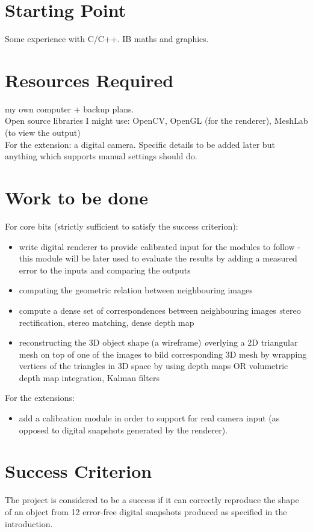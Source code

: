 \section*{Starting Point}
Some experience with C/C++.
IB maths and graphics.

\section*{Resources Required}
my own computer + backup plans.\\
Open source libraries I might use: OpenCV, OpenGL (for the renderer), MeshLab (to view the output) \\
For the extension: a digital camera. Specific details to be added later but anything which supports manual settings should do.  


\section*{Work to be done}
For core bits (strictly sufficient to satisfy the success criterion):
\begin{itemize}
\item write digital renderer to provide calibrated input for the modules to follow - this module will be later used to evaluate the results by adding a measured error to the inputs and comparing the outputs
\item computing the geometric relation between neighbouring images
\item compute a dense set of correspondences between neighbouring images
{\emph stereo rectification, stereo matching, dense depth map}
\item reconstructing the 3D object shape (a wireframe)
{\emph overlying a 2D triangular mesh on top of one of the images to bild corresponding 3D mesh by wrapping vertices of the triangles in 3D space by using depth maps OR volumetric depth map integration, Kalman filters}
\end{itemize}
For the extensions:
\begin{itemize}
\item add a calibration module in order to support for real camera input (as opposed to digital snapshots generated by the renderer).  
\end{itemize}

\section*{Success Criterion}
The project is considered to be a success if it can correctly reproduce the shape of an object from 12 error-free digital snapshots produced as specified in the introduction.\\ 

